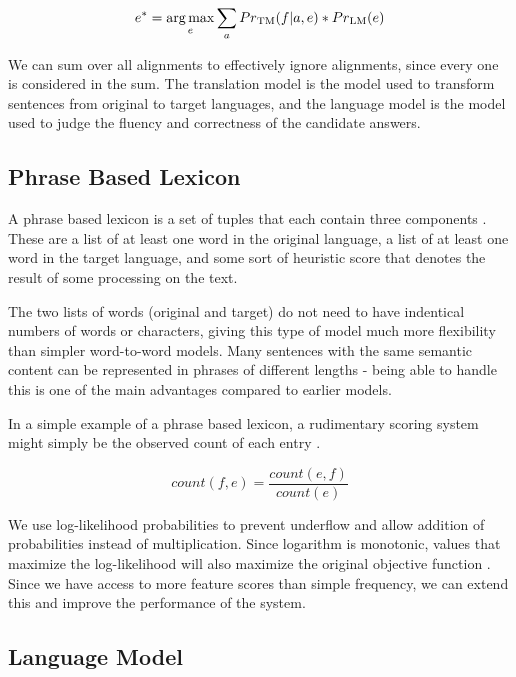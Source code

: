 \documentclass[11pt,letterpaper]{article}
\DeclareMathOperator*{\argmax}{arg\,max}
\begin{document}
\begin{displaymath}
e^* = \argmax_e \sum_{a} Pr \textsubscript{TM}(f | a,e) * Pr \textsubscript{LM}(e)
\end{displaymath}

We can sum over all alignments to effectively ignore alignments, since every one is considered in the sum. The translation model is the model used to transform sentences from original to target languages, and the language model is the model used to judge the fluency and correctness of the candidate answers.


\subsection{Phrase Based Lexicon}


A phrase based lexicon is a set of tuples that each contain three components \cite{Collins:2013}. These are a list of at least one word in the original language, a list of at least one word in the target language, and some sort of heuristic score that denotes the result of some processing on the text.

The two lists of words (original and target) do not need to have indentical numbers of words or characters, giving this type of model much more flexibility than simpler word-to-word models. Many sentences with the same semantic content can be represented in phrases of different lengths - being able to handle this is one of the main advantages compared to earlier models.

In a simple example of a phrase based lexicon, a rudimentary scoring system might simply be the observed count of each entry \cite{CollinsIBM}.

\begin{displaymath}
count(f,e) = \frac{count(e,f)}{count(e)}
\end{displaymath}

We use log-likelihood probabilities to prevent underflow and allow addition of probabilities instead of multiplication. Since logarithm is monotonic, values that maximize the log-likelihood will also maximize the original objective function \cite{Lopez}. Since we have access to more feature scores than simple frequency, we can extend this and improve the performance of the system.

\subsection{Language Model}
\end{document}
